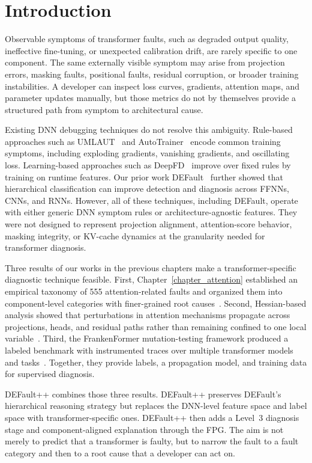 \section{Introduction}
\label{sec:defaultpp_introduction}

Observable symptoms of transformer faults, such as degraded output quality, ineffective fine-tuning, or unexpected calibration drift, are rarely specific to one component. The same externally visible symptom may arise from projection errors, masking faults, positional faults, residual corruption, or broader training instabilities. A developer can inspect loss curves, gradients, attention maps, and parameter updates manually, but those metrics do not by themselves provide a structured path from symptom to architectural cause.

Existing DNN debugging techniques do not resolve this ambiguity. Rule-based approaches such as UMLAUT~\cite{umlaut} and AutoTrainer~\cite{autotrainer} encode common training symptoms, including exploding gradients, vanishing gradients, and oscillating loss. Learning-based approaches such as DeepFD~\cite{deepfd} improve over fixed rules by training on runtime features. Our prior work DEFault~\cite{default} further showed that hierarchical classification can improve detection and diagnosis across FFNNs, CNNs, and RNNs. However, all of these techniques, including DEFault, operate with either generic DNN symptom rules or architecture-agnostic features. They were not designed to represent projection alignment, attention-score behavior, masking integrity, or KV-cache dynamics at the granularity needed for transformer diagnosis.

Three results of our works in the previous chapters make a transformer-specific diagnostic technique feasible. First, Chapter~\ref{chapter_attention} established an empirical taxonomy of 555 attention-related faults and organized them into component-level categories with finer-grained root causes~\cite{attention_taxonomy}. Second, Hessian-based analysis showed that perturbations in attention mechanisms propagate across projections, heads, and residual paths rather than remaining confined to one local variable~\cite{hessian_analysis}. Third, the FrankenFormer mutation-testing framework produced a labeled benchmark with instrumented traces over multiple transformer models and tasks~\cite{frankenformer}. Together, they provide labels, a propagation model, and training data for supervised diagnosis.

DEFault++ combines those three results. DEFault++ preserves DEFault's hierarchical reasoning strategy but replaces the DNN-level feature space and label space with transformer-specific ones. DEFault++ then adds a Level~3 diagnosis stage and component-aligned explanation through the FPG. The aim is not merely to predict that a transformer is faulty, but to narrow the fault to a fault category and then to a root cause that a developer can act on.

